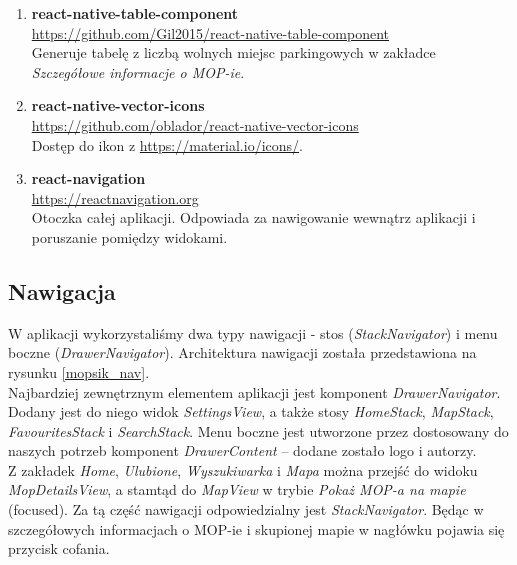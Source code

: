 \begin{enumerate}
\item \textbf{react-native-table-component} \\
\url{https://github.com/Gil2015/react-native-table-component}\\
Generuje tabelę z liczbą wolnych miejsc parkingowych w zakładce \textit{Szczegółowe informacje o MOP-ie}.

\item \textbf{react-native-vector-icons} \\
\url{https://github.com/oblador/react-native-vector-icons}\\
Dostęp do ikon z \url{https://material.io/icons/}.

\item \textbf{react-navigation} \\
\url{https://reactnavigation.org}\\
Otoczka całej aplikacji. Odpowiada za nawigowanie wewnątrz aplikacji i poruszanie pomiędzy widokami.
\end{enumerate}

\subsection{Nawigacja}
W aplikacji wykorzystaliśmy dwa typy nawigacji - stos (\textit{StackNavigator}) i menu boczne (\textit{DrawerNavigator}). Architektura nawigacji została przedstawiona na rysunku \ref{mopsik_nav}.\\


Najbardziej zewnętrznym elementem aplikacji jest komponent \textit{DrawerNavigator}. Dodany jest do niego widok \textit{SettingsView}, a także stosy \textit{HomeStack}, \textit{MapStack}, \textit{FavouritesStack} i \textit{SearchStack}. Menu boczne jest utworzone przez dostosowany do naszych potrzeb komponent \textit{DrawerContent} -- dodane zostało logo i autorzy. \\

Z zakładek \textit{Home}, \textit{Ulubione}, \textit{Wyszukiwarka} i
\textit{Mapa} można przejść do widoku \textit{MopDetailsView}, a stamtąd do
\textit{MapView} w trybie \textit{Pokaż MOP-a na mapie} (focused). Za tą część
nawigacji odpowiedzialny jest \textit{StackNavigator}. Będąc w szczegółowych informacjach o MOP-ie i skupionej mapie w nagłówku pojawia się przycisk cofania.\\

